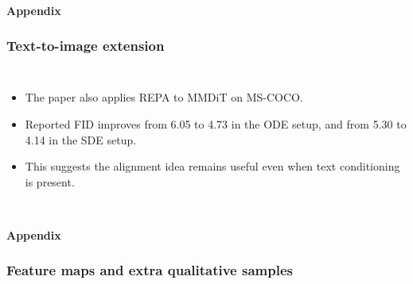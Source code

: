 \begin{frame}[t]
  \framesubtitle{Appendix}
  \frametitle{Text-to-image extension}
  \begin{columns}[T,totalwidth=\textwidth]
    \AppTTwoI[width=\linewidth]
    \begin{itemize}
      \item The paper also applies REPA to MMDiT on MS-COCO.
      \item Reported FID improves from 6.05 to 4.73 in the ODE setup, and from 5.30 to 4.14 in the SDE setup.
      \item This suggests the alignment idea remains useful even when text conditioning is present.
    \end{itemize}
  \end{columns}
\end{frame}

\begin{frame}[t]
  \framesubtitle{Appendix}
  \frametitle{Feature maps and extra qualitative samples}
  \begin{columns}[T,totalwidth=\textwidth]
    \AppFeature[width=\linewidth]
    \AppQualTop[width=\linewidth]
    \vspace{0.14cm}

    \AppQualBottom[width=\linewidth]
  \end{columns}
\end{frame}
